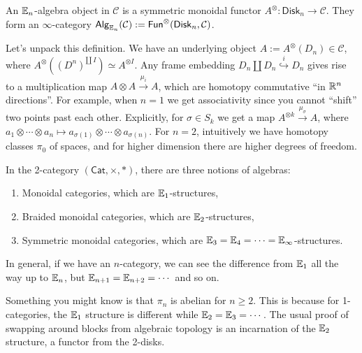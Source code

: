    \begin{definition}[]
       An $\mathbb{E}_n $-algebra object in $\mathcal{C} $ is a symmetric monoidal functor $A^{\otimes}\colon \mathsf{Disk} _n  \to \mathcal{C} $. They form an $\infty$-category $\mathsf{Alg} _{\mathbb{E}_n }(\mathcal{C} ):= \mathsf{Fun} ^{\otimes}(\mathsf{Disk} _n ,\mathcal{C} )$.
   \end{definition}
   Let's unpack this definition. We have an underlying object $A:= A^{\otimes}(D_n ) \in \mathcal{C} $, where $A^{\otimes}((D^n )^{\amalg\, I}) \simeq A^{\otimes I}$. Any frame embedding $D_n  \amalg D_n  \overset{i}{\hookrightarrow } D_n $ gives rise to a multiplication map $A\otimes A \xrightarrow{\mu _i } A$, which are homotopy commutative ``in $\mathbb{R}^n $ directions''. For example, when $n=1$ we get associativity since you cannot ``shift'' two points past each other. Explicitly, for $\sigma \in S_k$ we get a map $A ^{\otimes k}\xrightarrow{\mu _{\sigma }}A $, where $a_1 \otimes \cdots \otimes a_n  \mapsto a_{\sigma(1)}\otimes \cdots \otimes a_{\sigma(n)}$. For $n=2$, intuitively we have homotopy classes $\pi_0$ of spaces, and for higher dimension there are higher degrees of freedom.

   \begin{example}
       In the 2-category $(\mathsf{Cat} , \times ,*)$, there are three notions of algebras:
       \begin{enumerate}[label=(\arabic*)]
       \setlength\itemsep{-.2em}
           \item Monoidal categories, which are $\mathbb{E}_1$-structures,
            \item Braided monoidal categories, which are $\mathbb{E}_2$-structures,
            \item Symmetric monoidal categories, which are $\mathbb{E}_3=\mathbb{E}_4=\cdots =\mathbb{E}_{\infty}$-structures.
       \end{enumerate}In general, if we have an $n$-category, we can see the difference from $\mathbb{E}_1$ all the way up to $\mathbb{E}_n $, but $\mathbb{E}_{n+1}=\mathbb{E}_{n+2}= \cdots $ and so on.

       Something you might know is that $\pi_n $ is abelian for $n\geq 2$. This is because for 1-categories, the $\mathbb{E}_1$ structure is different while $\mathbb{E}_2=\mathbb{E}_3=\cdots $. The usual proof of swapping around blocks from algebraic topology is an incarnation of the $\mathbb{E}_2$ structure, a functor from the 2-disks.
   \end{example}

